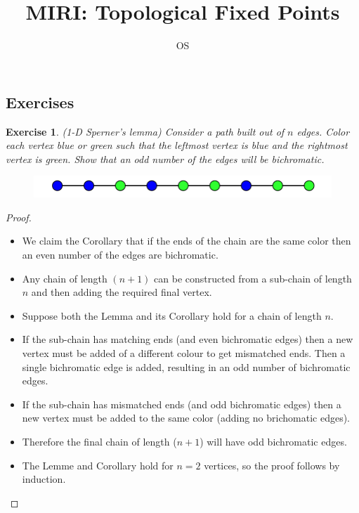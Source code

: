 \documentclass[12pt]{article}
\title{MIRI: Topological Fixed Points}
\author{OS}
\newtheorem{exercise}{Exercise}
\begin{document}
\maketitle


\subsection*{Exercises}


\begin{exercise}
    (1-D Sperner's lemma) Consider a path built out of $n$ edges. Color each vertex blue or green such that the leftmost vertex is blue and the rightmost vertex is green. Show that an odd number of the edges will be bichromatic.
\end{exercise}

\begin{figure}[h]
    \centering
    \includegraphics[width=15cm]{Fixed_points_1.png}
    
    \label{fig:my_label}
\end{figure}


\begin{proof}

    \begin{itemize}
        \item We claim the Corollary that if the ends of the chain are the same color then an even number of the edges are bichromatic.
        \item Any chain of length $(n+1)$ can be constructed from a sub-chain of length $n$ and then adding the required final vertex.
        \item Suppose both the Lemma and its Corollary hold for a chain of length $n$.
        \item If the sub-chain has matching ends (and even bichromatic edges) then a new vertex must be added of a different colour to get mismatched ends. Then a single bichromatic edge is added, resulting in an odd number of bichromatic edges.
        \item If the sub-chain has mismatched ends (and odd bichromatic edges) then a new vertex must be added to the same color (adding no brichomatic edges).
        \item Therefore the final chain of length ($n+1$) will have odd bichromatic edges.
        \item The Lemme and Corollary hold for $n = 2$ vertices, so the proof follows by induction.
    \end{itemize}

\end{proof}
\end{document}
